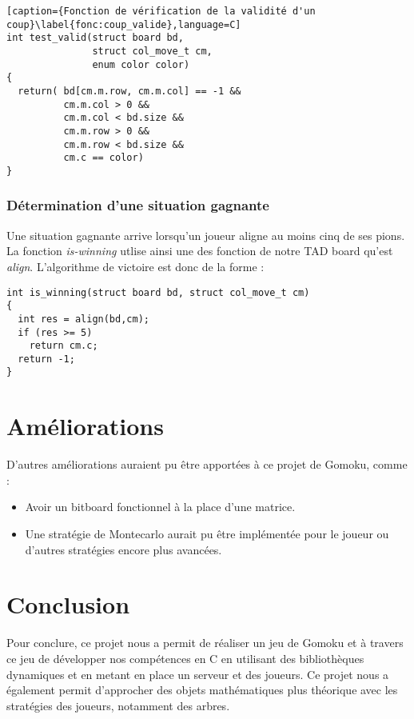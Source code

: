 \documentclass[12pt]{article}
\begin{document}
\begin{center}
    \begin{lstlisting}[caption={Fonction de vérification de la validité d'un coup}\label{fonc:coup_valide},language=C]
int test_valid(struct board bd,
               struct col_move_t cm,
               enum color color)
{
  return( bd[cm.m.row, cm.m.col] == -1 &&
          cm.m.col > 0 &&
          cm.m.col < bd.size &&
          cm.m.row > 0 &&
          cm.m.row < bd.size &&
          cm.c == color)
}
    \end{lstlisting}
\end{center}


\subsubsection{Détermination d'une situation gagnante}

Une situation gagnante arrive lorsqu'un joueur aligne au moins cinq de ses pions. La fonction \textit{is-winning} utlise ainsi une des fonction de notre TAD board qu'est \textit{align}. L'algorithme de victoire est donc de la forme :

\begin{lstlisting}
int is_winning(struct board bd, struct col_move_t cm)
{
  int res = align(bd,cm);
  if (res >= 5)
    return cm.c;
  return -1;
}
\end{lstlisting}


\section{Améliorations}

D'autres améliorations auraient pu être apportées à ce projet de Gomoku, comme :
\begin{itemize}
    \item Avoir un bitboard fonctionnel à la place d'une matrice.
    \item Une stratégie de Montecarlo aurait pu être implémentée pour le joueur ou d'autres stratégies encore plus avancées.
\end{itemize}

\section{Conclusion}

Pour conclure, ce projet nous a permit de réaliser un jeu de Gomoku et à travers ce jeu de développer nos compétences en C en utilisant des bibliothèques dynamiques et en metant en place un serveur et des joueurs. Ce projet nous a également permit d'approcher des objets mathématiques plus théorique avec les stratégies des joueurs, notamment des arbres.
\end{document}
